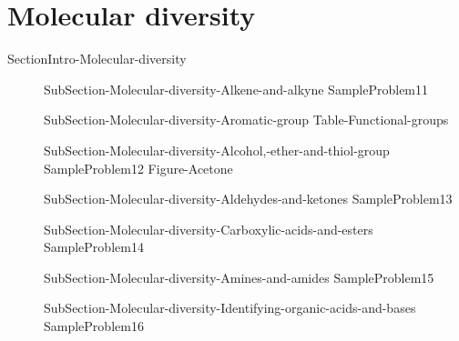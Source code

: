 \documentclass[main.tex]{subfiles}
\newcommand\chapterlabel{Ch-orgo}\setcounter{figurenewcounter}{0}\setcounter{tablenewcounter}{0}\setcounter{formulanewcounter}{0}
\begin{document}
\section{Molecular diversity}{SectionIntro-Molecular-diversity}
\sloppy\begin{description}
\item[]{SubSection-Molecular-diversity-Alkene-and-alkyne}
{SampleProblem11}
 \item[]{SubSection-Molecular-diversity-Aromatic-group}
 {Table-Functional-groups}
\item[]{SubSection-Molecular-diversity-Alcohol,-ether-and-thiol-group}
{SampleProblem12}
\newpage\hspace{0cm}  {Figure-Acetone}

\item[] {SubSection-Molecular-diversity-Aldehydes-and-ketones}
{SampleProblem13}

\item[]{SubSection-Molecular-diversity-Carboxylic-acids-and-esters}
{SampleProblem14}
 \item[] {SubSection-Molecular-diversity-Amines-and-amides}
  {SampleProblem15}

\item[]{SubSection-Molecular-diversity-Identifying-organic-acids-and-bases}
{SampleProblem16}
 \end{description}
 
 
 
\end{document}
